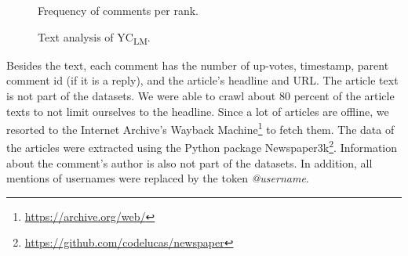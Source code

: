 \begin{figure}
    \centering
    \caption{Frequency of comments per rank.}
    \label{fig:comments_per_rank}
\end{figure}

\begin{figure}
    \centering
    \caption{Text analysis of YC\textsubscript{LM}.}
    \label{fig:word_based_anal}
\end{figure}

Besides the text, each comment has the number of up-votes, timestamp, parent comment id (if it is a reply), and the article's headline and URL. The article text is not part of the datasets. We were able to crawl about 80 percent of the article  texts to not limit ourselves to the headline. Since a lot of articles are offline, we resorted to the Internet Archive's Wayback Machine\footnote{\url{https://archive.org/web/}} to fetch them.
The data of the articles were extracted using the Python package Newspaper3k\footnote{\url{https://github.com/codelucas/newspaper}}.
Information about the comment's author is also not part of the datasets.
In addition, all mentions of usernames were replaced by the token \textit{@username}.

